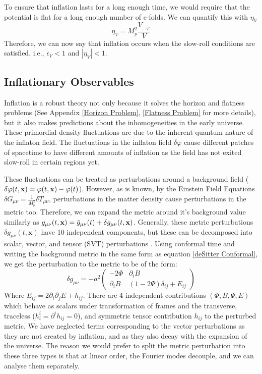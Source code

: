 \documentclass[aps,prd,reprint,preprintnumbers,showpacs,floatfix,nofootinbib,superscript address]{revtex4-2}
\begin{document}
To ensure that inflation lasts for a long enough time, we would require that the potential is flat for a long enough number of e-folds. We can quantify this with $\eta_V$
\begin{equation}
    \eta_V = M_p^2  \frac{V_{,,\varphi}}{V} 
\end{equation}
Therefore, we can now say that inflation occurs when the slow-roll conditions are satisfied, i.e., $\epsilon_V < 1$ and $|\eta_V|< 1$.
\subsection{Inflationary Observables} \label{Inflationary Observables}
Inflation is a robust theory not only because it solves the horizon and flatness problems (See Appendix \cref{Horizon Problem}, \cref{Flatness Problem} for more details), but it also makes predictions about the inhomogeneities in the early universe. These primordial density fluctuations are due to the inherent quantum nature of the inflaton field. 
The fluctuations in the inflaton field $\delta\varphi$ cause different patches of spacetime to have different amounts of inflation as the field has not exited slow-roll in certain regions yet. 

These fluctuations can be treated as perturbations around a background field ($\delta\varphi(t,\textbf{x}) = \varphi(t,\textbf{x}) - \Bar{\varphi}(t)$). However, as is known, by the Einstein Field Equations $\delta G_{\mu\nu} = \frac{1}{M_p^2}\delta T_{\mu \nu}$, perturbations in the matter density cause perturbations in the metric too. Therefore, we can expand the metric around it's background value similarly as $g_{\mu\nu}(t,\textbf{x}) = \Bar{g}_{\mu\nu}(t) + \delta g_{\mu\nu}(t,\textbf{x})$. Generally, these metric perturbations $\delta g_{\mu\nu}(t,\textbf{x})$ have 10 independent components, but these can be decomposed into scalar, vector, and tensor (SVT) perturbations \cite{liddle_cosmological_2000, malik_cosmological_2009}. Using conformal time and writing the background metric in the same form as equation \cref{deSitter Conformal}, we get the perturbation to the metric to be of the form:
\begin{equation} \label{Perturbed metric}
    \delta g_{\mu\nu}
    = 
    -a^2
    \begin{pmatrix}
        -2 \Phi & \partial_iB \\
        \partial_iB & (1-2\Psi)\delta_{ij} + E_{ij} 
    \end{pmatrix}
\end{equation}
Where $E_{ij} = 2\partial_i\partial_j E + h_{ij}$. There are 4 independent contributions $(\Phi, B, \Psi, E)$ which behave as scalars under transformation of frames and the transverse, traceless ($h_i^i = \partial^ih_{ij} = 0$), and symmetric tensor contribution $h_{ij}$ to the perturbed metric. We have neglected terms corresponding to the vector perturbations as they are not created by inflation, and as they also decay with the expansion of the universe. The reason we would prefer to split the metric perturbation into these three types is that at linear order, the Fourier modes decouple, and we can analyse them separately. 
\end{document}
